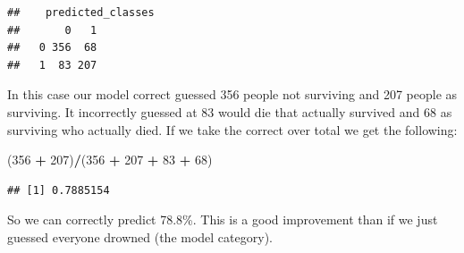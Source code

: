 \documentclass[]{book}
\newenvironment{Shaded}{\begin{snugshade}}{\end{snugshade}}
\newcommand{\KeywordTok}[1]{\textcolor[rgb]{0.13,0.29,0.53}{\textbf{#1}}}
\newcommand{\DataTypeTok}[1]{\textcolor[rgb]{0.13,0.29,0.53}{#1}}
\newcommand{\DecValTok}[1]{\textcolor[rgb]{0.00,0.00,0.81}{#1}}
\newcommand{\FloatTok}[1]{\textcolor[rgb]{0.00,0.00,0.81}{#1}}
\newcommand{\StringTok}[1]{\textcolor[rgb]{0.31,0.60,0.02}{#1}}
\newcommand{\OperatorTok}[1]{\textcolor[rgb]{0.81,0.36,0.00}{\textbf{#1}}}
\newcommand{\NormalTok}[1]{#1}
\begin{document}
\begin{Shaded}
\end{Shaded}

\begin{verbatim}
##    predicted_classes
##       0   1
##   0 356  68
##   1  83 207
\end{verbatim}

In this case our model correct guessed 356 people not surviving and 207
people as surviving. It incorrectly guessed at 83 would die that
actually survived and 68 as surviving who actually died. If we take the
correct over total we get the following:

\begin{Shaded}
\begin{Highlighting}[]
\NormalTok{(}\DecValTok{356} \OperatorTok{+}\StringTok{ }\DecValTok{207}\NormalTok{)}\OperatorTok{/}\NormalTok{(}\DecValTok{356} \OperatorTok{+}\StringTok{ }\DecValTok{207} \OperatorTok{+}\StringTok{ }\DecValTok{83} \OperatorTok{+}\StringTok{ }\DecValTok{68}\NormalTok{)}
\end{Highlighting}
\end{Shaded}

\begin{verbatim}
## [1] 0.7885154
\end{verbatim}

So we can correctly predict 78.8\%. This is a good improvement than if
we just guessed everyone drowned (the model category).

\begin{Shaded}
\end{Shaded}
\end{document}
